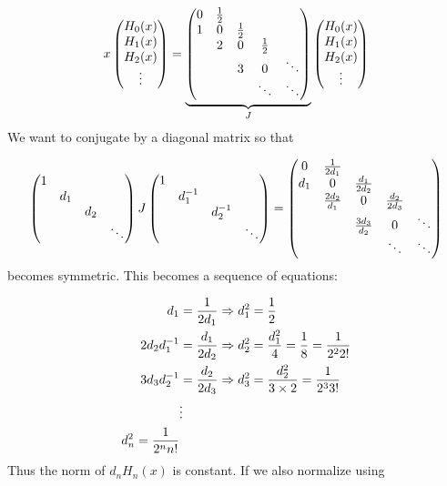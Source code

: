 \documentclass[12pt,landscape]{article}
\def\half{ {1 \over 2} }
\begin{document}
{\[
x \begin{pmatrix} H_0(x) \\ H_1(x) \\ H_2(x) \\ \vdots \end{pmatrix} = \underbrace{\begin{pmatrix} 0 & {1 \over 2} \\
1 & 0 & \half \\
& 2 & 0 & \half \\
&& 3 & 0 & \ddots \\
&&& \ddots & \ddots
\end{pmatrix}}_J\begin{pmatrix} H_0(x) \\ H_1(x) \\ H_2(x) \\ \vdots \end{pmatrix}
\]
We want to conjugate by a diagonal matrix so that

\[
\begin{pmatrix}1 \\ & d_1 \\ &&d_2 \\&&&\ddots \end{pmatrix}  J \begin{pmatrix}1 \\ & d_1^{-1} \\ &&d_2^{-1} \\&&&\ddots \end{pmatrix} = \begin{pmatrix} 0 & {1 \over 2d_1} \\
d_1 & 0 & {d_1 \over 2 d_2} \\
& {2d_2 \over d_1} & 0 & {d_2 \over 2 d_3} \\
&& {3d_3 \over d_2} & 0 & \ddots \\
&&& \ddots & \ddots
\end{pmatrix}
\]
becomes symmetric. This becomes a sequence of equations:


\begin{align*}
d_1 &= {1 \over 2 d_1} \Rightarrow d_1^2 = {1 \over 2} \\
2d_2d_1^{-1} &= {d_1 \over 2 d_2} \Rightarrow d_2^2 = {d_1^2 \over 4} = {1 \over 8} = {1 \over 2^2 2!} \\
3d_3d_2^{-1} &= {d_2 \over 2 d_3} \Rightarrow d_3^2 = {d_2^2 \over 3\times 2} = {1 \over 2^3 3!} \\
&\vdots \\
d_n^2 = {1 \over 2^n n!}
\end{align*}
Thus the norm of $d_n H_n(x)$ is constant. If we also normalize using

}
\end{document}
